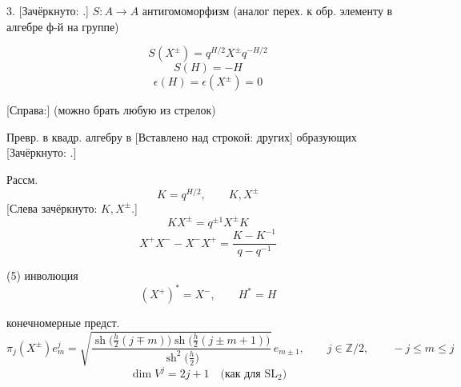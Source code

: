 3. [Зачёркнуто: .]
$S:A\to A$ антигомоморфизм (аналог перех. к обр.
элементу в алгебре ф-й на группе)

\begin{equation*}
S(X^\pm)=q^{H/2}X^\pm q^{-H/2}
\tag{4}
\end{equation*}
\begin{equation*}
S(H)=-H
\end{equation*}
\begin{equation*}
\epsilon(H)=\epsilon(X^\pm)=0
\end{equation*}

\begin{center}
\end{center}
[Справа:] (можно брать любую из стрелок)

Превр. в квадр. алгебру в [Вставлено над строкой: других] образующих
[Зачёркнуто: .]

Рассм.
\begin{equation*}
K=q^{H/2},\qquad K,X^\pm
\end{equation*}
[Слева зачёркнуто: $K,X^\pm$.]
\begin{equation*}
KX^\pm=q^{\pm1}X^\pm K
\end{equation*}
\begin{equation*}
X^+X^- -X^-X^+=\frac{K-K^{-1}}{q-q^{-1}}
\end{equation*}



(5) инволюция
\begin{equation*}
(X^+)^*=X^-,\qquad H^*=H
\end{equation*}

конечномерные предст.
\begin{equation*}
\pi_j(X^{\pm})e_m^j=
\sqrt{\frac{\operatorname{sh}\bigl(\frac h2(j\mp m)\bigr)
\operatorname{sh}\bigl(\frac h2(j\pm m+1)\bigr)}
{\operatorname{sh}^{2}\bigl(\frac h2\bigr)}}\,e_{m\pm1},
\qquad j\in\mathbb Z/2,
\qquad -j\le m\le j
\tag{6}
\end{equation*}
\begin{equation*}
\dim V^j=2j+1\quad\text{(как для $\mathrm{SL}_2$)}
\end{equation*}

